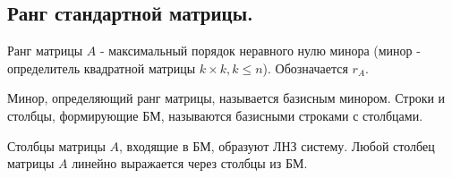 \documentclass[a4paper,14pt]{article}
\begin{document}
\subsection{Ранг стандартной матрицы.}
\begin{definition}
	Ранг матрицы $A$ - максимальный порядок неравного нулю минора (минор - определитель квадратной матрицы $k \times k, k \le n$). Обозначается $r_A$.
\end{definition}
\begin{definition}
	Минор, определяющий ранг матрицы, называется базисным минором. Строки и столбцы, формирующие БМ, называются базисными строками с столбцами.
\end{definition}
\begin{theorem}
	Столбцы матрицы $A$, входящие в БМ, образуют ЛНЗ систему. Любой столбец матрицы $A$ линейно выражается через столбцы из БМ.
\end{theorem}
\end{document}
